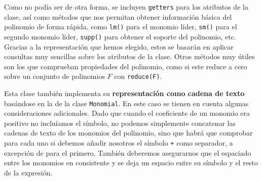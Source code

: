 Como no podía ser de otra forma, se incluyen \texttt{getters} para los atributos de la clase, así como métodos que nos permitan obtener información básica del polinomio de forma rápida, como \texttt{lm()} para el monomio líder, \texttt{sm()} para el segundo monomio líder, \texttt{supp()} para obtener el soporte del polinomio, etc. Gracias a la representación que hemos elegido, estos se basarán en aplicar consultas muy sencillas sobre los atributos de la clase. Otros métodos muy útiles son los que comprueban propiedades del polinomio, como si este reduce a cero sobre un conjunto de polinomios $F$ con \texttt{reduce(F)}.\newline

Esta clase también implementa su \textbf{representación como cadena de texto} basándose en la de la clase \texttt{Monomial}. En este caso se tienen en cuenta algunas consideraciones adicionales. Dado que cuando el coeficiente de un monomio era positivo no incluíamos el símbolo, no podemos simplemente concatenar las cadenas de texto de los monomios del polinomio, sino que habrá que comprobar para cada uno si debemos añadir nosotros el símbolo \texttt{+} como separador, a excepción de para el primero. También deberemos asegurarnos que el espaciado entre los monomios en consistente y se deja un espacio entre su símbolo y el resto de la expresión.\newline

